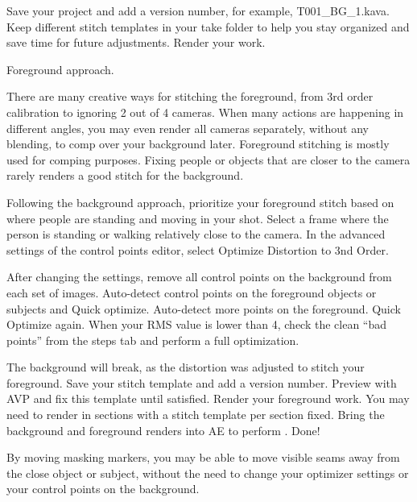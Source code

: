 \begin{fullwidth}
Save your project and add a version number, for example, T001\_BG\_1.kava. Keep different stitch templates in your take folder to help you stay organized and save time for future adjustments. Render your work.


{\large Foreground approach. \par}

There are many creative ways for stitching the foreground, from 3rd order calibration to ignoring 2 out of 4 cameras. When many actions are happening in different angles, you may even render all cameras separately, without any blending, to comp over your background later. Foreground stitching is mostly used for comping purposes. Fixing people or objects that are closer to the camera rarely renders a good stitch for the background.

\clearpage

Following the background approach, prioritize your foreground stitch based on where people are standing and moving in your shot. Select a frame where the person is standing or walking relatively close to the camera. In the advanced settings of the control points editor, select Optimize Distortion to 3nd Order.


After changing the settings, remove all control points on the background from each set of images. Auto-detect control points on the foreground objects or subjects and Quick optimize. Auto-detect more points on the foreground. Quick Optimize again. When your RMS value is lower than 4, check the clean “bad points” from the steps tab and perform a full optimization.


\clearpage

The background will break, as the distortion was adjusted to stitch your foreground. Save your stitch template and add a version number. Preview with AVP and fix this template until satisfied. Render your foreground work. You may need to render in sections with a stitch template per section fixed. Bring the background and foreground renders into AE to perform \textbf{}. Done!


\tip By moving masking markers, you may be able to move visible seams away from the close object or subject, without the need to change your optimizer settings or your control points on the background.


\clearpage
\end{fullwidth}